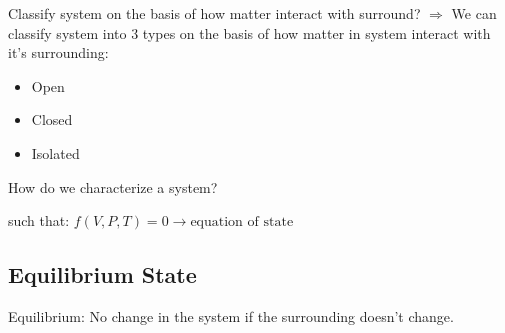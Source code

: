 \documentclass[fleqn,10pt]{SelfArx} %
\begin{document}
\begin{question}[label={q:1.2}]{Classify system on the basis of how matter interact with surround?}
$\Rightarrow$ We can classify system into 3 types on the basis of how matter in system interact with it's surrounding:

\begin{itemize}[noitemsep]
	\item Open
	\item Closed
	\item Isolated
\end{itemize}
\end{question}

\begin{question}[label={q:1.3}]{How do we characterize a system?}

    such that: $f(V,P,T)=0 \rightarrow \text{equation of state}$
\end{question}

\subsection{Equilibrium State}
Equilibrium: No change in the system if the surrounding doesn't change.
\end{document}
